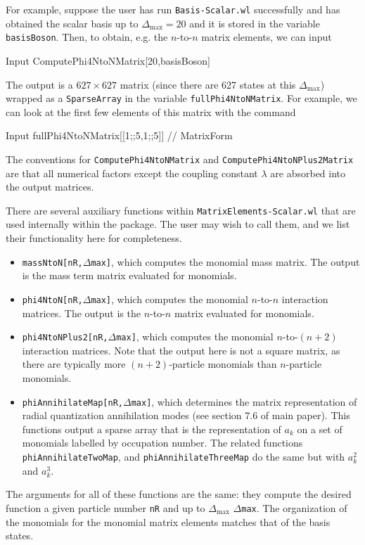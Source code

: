 \documentclass[12pt]{article}
\begin{document}
For example, suppose the user has run {\tt Basis-Scalar.wl} successfully and has obtained the scalar basis up to $\Delta_{\textrm{max}} = 20$ and it is stored in the variable {\tt basisBoson}. Then, to obtain, e.g. the $n$-to-$n$ matrix elements, we can input \begin{mmaCell}[moredefined={ComputePhi4NtoNMatrix,basisBoson}]{Input}
  ComputePhi4NtoNMatrix[20,basisBoson]
\end{mmaCell}
The output is a $627 \times 627$ matrix (since there are 627 states at this $\Delta_{\textrm{max}}$) wrapped as a {\tt SparseArray} in the variable {\tt fullPhi4NtoNMatrix}. For example, we can look at the first few elements of this matrix with the command \begin{mmaCell}[moredefined={fullPhi4NtoNMatrix}]{Input}
  fullPhi4NtoNMatrix[[1;;5,1;;5]] // MatrixForm
\end{mmaCell}
The conventions for {\tt ComputePhi4NtoNMatrix} and {\tt ComputePhi4NtoNPlus2Matrix} are that all numerical factors except the coupling constant $\lambda$ are absorbed into the output matrices. 


There are several auxiliary functions within {\tt MatrixElements-Scalar.wl} that are used internally within the package. The user may wish to call them, and we list their functionality here for completeness. \begin{itemize}
	\item {\tt massNtoN[nR,$\Delta$max]}, which computes the monomial mass matrix. The output is the mass term matrix evaluated for monomials.
  \item {\tt phi4NtoN[nR,$\Delta$max]}, which computes the monomial $n$-to-$n$ interaction matrices. The output is the $n$-to-$n$ matrix evaluated for monomials. 
  \item {\tt phi4NtoNPlus2[nR,$\Delta$max]}, which computes the monomial $n$-to-$(n+2)$ interaction matrices. Note that the output here is not a square matrix, as there are typically more $(n+2)$-particle monomials than $n$-particle monomials.
  \item {\tt phiAnnihilateMap[nR,$\Delta$max]}, which determines the matrix representation of radial quantization annihilation modes (see section 7.6 of main paper). This functions output a sparse array that is the representation of $a_k$ on a set of monomials labelled by occupation number. The related functions {\tt phiAnnihilateTwoMap}, and {\tt phiAnnihilateThreeMap} do the same but with $a_k^2$ and $a_k^3$.
\end{itemize} The arguments for all of these functions are the same: they compute the desired function a given particle number {\tt nR} and up to $\Delta_{\textrm{max}}$ {\tt $\Delta$max}. The organization of the monomials for the monomial matrix elements matches that of the basis states.
\end{document}
